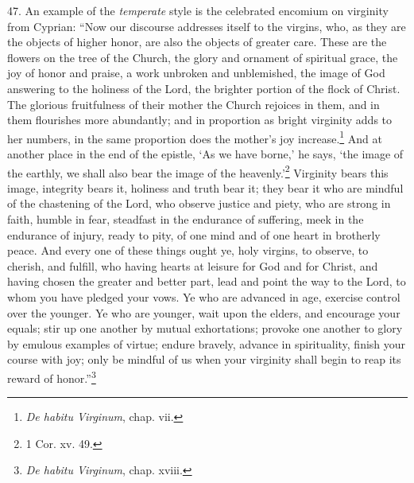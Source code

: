 47. An example of the \emph{ temperate} style is the celebrated encomium on virginity from Cyprian: “Now our discourse addresses itself to the virgins, who, as they are the objects of higher honor, are also the objects of greater care. These are the flowers on the tree of the Church, the glory and ornament of spiritual grace, the joy of honor and praise, a work unbroken and unblemished, the image of God answering to the holiness of the Lord, the brighter portion of the flock of Christ. The glorious fruitfulness of their mother the Church rejoices in them, and in them flourishes more abundantly; and in proportion as bright virginity adds to her numbers, in the same proportion does the mother’s joy increase.\footnote{\emph{De habitu Virginum}, chap. vii.} And at another place in the end of the epistle, ‘As we have borne,’ he says, ‘the image of the earthly, we shall also bear the image of the heavenly.’\footnote{1 Cor. xv. 49.} Virginity bears this image, integrity bears it, holiness and truth bear it; they bear it who are mindful of the chastening of the Lord, who observe justice and piety, who are strong in faith, humble in fear, steadfast in the endurance of suffering, meek in the endurance of injury, ready to pity, of one mind and of one heart in brotherly peace. And every one of these things ought ye, holy virgins, to observe, to cherish, and fulfill, who having hearts at leisure for God and for Christ, and having chosen the greater and better part, lead and point the way to the Lord, to whom you have pledged your vows. Ye who are advanced in age, exercise control over the younger. Ye who are younger, wait upon the elders, and encourage your equals; stir up one another by mutual exhortations; provoke one another to glory by emulous examples of virtue; endure bravely, advance in spirituality, finish your course with joy; only be mindful of us when your virginity shall begin to reap its reward of honor.”\footnote{\emph{De habitu Virginum}, chap. xviii.}

